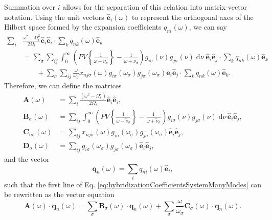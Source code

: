Summation over $i$ allows for the separation of this relation into matrix-vector notation. Using the unit vectors $\hat{\mathbf{e}}_i(\omega)$ to represent the orthogonal axes of the Hilbert space formed by the expansion coefficients $q_{ni}(\omega)$, we can say
\begin{equation}
\begin{split}
\sum_i&\frac{\omega^2 - \Omega_i^2}{2\Omega_i}\hat{\mathbf{e}}_i\hat{\mathbf{e}}_i\cdot\sum_kq_{nk}(\omega)\hat{\mathbf{e}}_k\\
&= \sum_\sigma\sum_{ij}\int_0^\infty\left(PV\left\{\frac{1}{\omega - \tilde{\nu}_\sigma}\right\} - \frac{1}{\omega + \tilde{\nu}_\sigma}\right)g_{i\sigma}(\nu)g_{j\sigma}(\nu)\;\mathrm{d}\nu\;\hat{\mathbf{e}}_i\hat{\mathbf{e}}_j\cdot\sum_kq_{nk}(\omega)\hat{\mathbf{e}}_k\\
&\qquad + \sum_{\sigma}\sum_{ij}\frac{\omega}{\omega_\sigma}x_{nj\sigma}(\omega)g_{i\sigma}(\omega_\sigma)g_{j\sigma}(\omega_\sigma)\hat{\mathbf{e}}_i\hat{\mathbf{e}}_j\cdot\sum_kq_{nk
}(\omega)\hat{\mathbf{e}}_k.
\end{split}
\end{equation}
Therefore, we can define the matrices 
\begin{equation}
\begin{split}
\mathbf{A}(\omega) &= \sum_i\frac{(\omega^2 - \Omega_i^2)}{2\Omega_i}\hat{\mathbf{e}}_i\hat{\mathbf{e}}_i,\\
\mathbf{B}_\sigma(\omega) &= \sum_{ij}\int_0^\infty\left(PV\left\{\frac{1}{\omega - \tilde{\nu}_\sigma}\right\} - \frac{1}{\omega + \tilde{\nu}_\sigma}\right)g_{i\sigma}(\nu)g_{j\sigma}(\nu)\;\mathrm{d}\nu\,\hat{\mathbf{e}}_i\hat{\mathbf{e}}_j,\\
\mathbf{C}_{n\sigma}(\omega) &= \sum_{ij} x_{nj\sigma}(\omega)g_{i\sigma}(\omega_\sigma)g_{j\sigma}(\omega_\sigma)\hat{\mathbf{e}}_i\hat{\mathbf{e}}_j,\\
\mathbf{D}_\sigma(\omega) &= \sum_{ij}g_{i\sigma}(\omega_\sigma)g_{j\sigma}(\omega_\sigma)\hat{\mathbf{e}}_i\hat{\mathbf{e}}_j,
\end{split}
\end{equation}
and the vector
\begin{equation}
\mathbf{q}_n(\omega) = \sum_iq_{ni}(\omega)\hat{\mathbf{e}}_i,
\end{equation}
such that the first line of Eq. \eqref{eq:hybridizationCoefficientsSystemManyModes} can be rewritten as the vector equation
\begin{equation}\label{eq:ABCmatrixIdentity}
\mathbf{A}(\omega)\cdot\mathbf{q}_n(\omega) = \sum_\sigma\mathbf{B}_\sigma(\omega)\cdot\mathbf{q}_n(\omega) + \sum_\sigma \frac{\omega}{\omega_\sigma}\mathbf{C}_\sigma(\omega)\cdot\mathbf{q}_n(\omega).
\end{equation}

